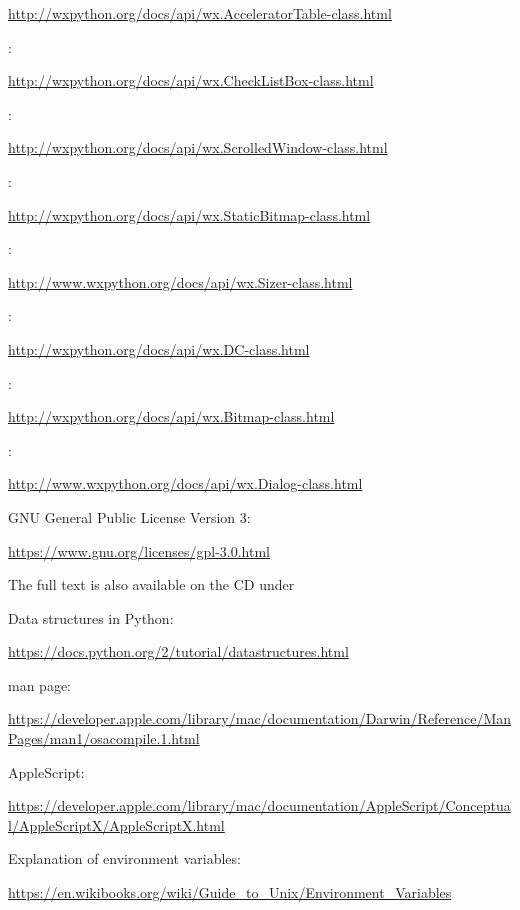 \documentclass[12pt,a4paper,naustrian,english,oneside,openright,DIV=12,BCOR=1cm]{scrbook}
\begin{document}
\begin{thebibliography}{999}
	\url{http://wxpython.org/docs/api/wx.AcceleratorTable-class.html}
	
	 :
	
	\url{http://wxpython.org/docs/api/wx.CheckListBox-class.html}
	
	 :
	
	\url{http://wxpython.org/docs/api/wx.ScrolledWindow-class.html}
	
	 :
	
	\url{http://wxpython.org/docs/api/wx.StaticBitmap-class.html}
	
	 :
	
	\url{http://www.wxpython.org/docs/api/wx.Sizer-class.html}
	
	 :
	
	\url{http://wxpython.org/docs/api/wx.DC-class.html}
	
	 :
	
	\url{http://wxpython.org/docs/api/wx.Bitmap-class.html}
	
	 :
	
	\url{http://www.wxpython.org/docs/api/wx.Dialog-class.html}
	
	 GNU General Public License Version 3:
	
	\url{https://www.gnu.org/licenses/gpl-3.0.html}
	
	
	The full text is also available on the CD under 
	
	 Data structures in Python:
	
	\url{https://docs.python.org/2/tutorial/datastructures.html}
	
	  man page:
	
	\url{https://developer.apple.com/library/mac/documentation/Darwin/Reference/ManPages/man1/osacompile.1.html}
	
	 AppleScript: 
	
	\url{https://developer.apple.com/library/mac/documentation/AppleScript/Conceptual/AppleScriptX/AppleScriptX.html}
	
	 Explanation of environment variables:  
	
	\url{https://en.wikibooks.org/wiki/Guide_to_Unix/Environment_Variables}
	

\end{thebibliography}
\end{document}
